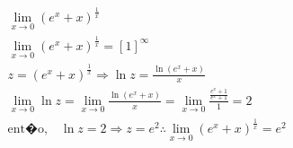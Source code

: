 \begin{ex}
\begin{align}
&\lim_{x\rightarrow 0} (e^{x}+x)^{\frac{1}{x}}\nonumber\\
&\lim_{x\rightarrow 0} (e^{x}+x)^{\frac{1}{x}}=[1]^\infty\nonumber\\
&z=(e^{x}+x)^{\frac{1}{x}} \Rightarrow \ln{z}=\frac{\ln(e^{x}+x)}{x}\nonumber\\
&\lim_{x\rightarrow 0} \ln{z}= \lim_{x\rightarrow 0} \frac{\ln{(e^{x}+x)}}{x}= \lim_{x\rightarrow 0} \frac{\frac{e^{x}+1}{e^{x}+1}}{1}= 2\nonumber\\
&\text{ent�o,}\quad \ln{z}=2 \Rightarrow z=e^2 \therefore \lim_{x\rightarrow 0} (e^{x}+x)^{\frac{1}{x}}=e^2\nonumber
\end{align}
\end{ex}

